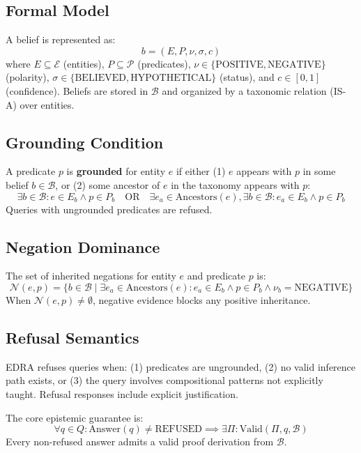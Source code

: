 \documentclass[11pt]{article}
\begin{document}
\subsection{Formal Model}

A belief is represented as:
\[
b = (E, P, \nu, \sigma, c)
\]
where $E \subseteq \mathcal{E}$ (entities), $P \subseteq \mathcal{P}$ (predicates), $\nu \in \{\text{POSITIVE}, \text{NEGATIVE}\}$ (polarity), $\sigma \in \{\text{BELIEVED}, \text{HYPOTHETICAL}\}$ (status), and $c \in [0,1]$ (confidence). Beliefs are stored in $\mathcal{B}$ and organized by a taxonomic relation (IS-A) over entities.

\subsection{Grounding Condition}

A predicate $p$ is \textbf{grounded} for entity $e$ if either (1) $e$ appears with $p$ in some belief $b \in \mathcal{B}$, or (2) some ancestor of $e$ in the taxonomy appears with $p$:
\[
\exists b \in \mathcal{B}: e \in E_b \land p \in P_b \quad \text{OR} \quad \exists e_a \in \text{Ancestors}(e), \exists b \in \mathcal{B}: e_a \in E_b \land p \in P_b
\]
Queries with ungrounded predicates are refused.

\subsection{Negation Dominance}

The set of inherited negations for entity $e$ and predicate $p$ is:
\[
\mathcal{N}(e, p) = \{b \in \mathcal{B} \mid \exists e_a \in \text{Ancestors}(e): e_a \in E_b \land p \in P_b \land \nu_b = \text{NEGATIVE}\}
\]
When $\mathcal{N}(e, p) \neq \emptyset$, negative evidence blocks any positive inheritance.

\subsection{Refusal Semantics}

EDRA refuses queries when: (1) predicates are ungrounded, (2) no valid inference path exists, or (3) the query involves compositional patterns not explicitly taught. Refusal responses include explicit justification.

The core epistemic guarantee is:
\[
\forall q \in Q: \text{Answer}(q) \neq \text{REFUSED} \implies \exists \Pi: \text{Valid}(\Pi, q, \mathcal{B})
\]
Every non-refused answer admits a valid proof derivation from $\mathcal{B}$.
\end{document}
